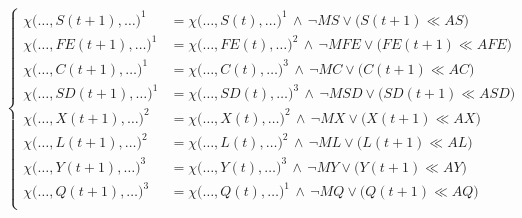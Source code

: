 \begin{equation}
 \begin{cases} 
 \chi\big(\dotsc, S(t + 1),  \dotsc \big)^1 &= \chi\big(\dotsc, S(t),  \dotsc \big)^1 \, \wedge \, \neg MS  \vee \big(S(t + 1)  \ll AS\big) \\
 \chi\big(\dotsc, FE(t + 1), \dotsc \big)^1 &= \chi\big(\dotsc, FE(t), \dotsc \big)^2 \, \wedge \, \neg MFE \vee \big(FE(t + 1) \ll AFE\big) \\ 
 \chi\big(\dotsc, C(t + 1),  \dotsc \big)^1 &= \chi\big(\dotsc, C(t),  \dotsc \big)^3 \, \wedge \, \neg MC  \vee \big(C(t + 1)  \ll AC\big) \\  
 \chi\big(\dotsc, SD(t + 1), \dotsc \big)^1 &= \chi\big(\dotsc, SD(t), \dotsc \big)^3 \, \wedge \, \neg MSD \vee \big(SD(t + 1) \ll ASD\big) \\

 \chi\big(\dotsc, X(t + 1), \dotsc \big)^2 &= \chi\big(\dotsc, X(t), \dotsc \big)^2 \, \wedge \, \neg MX \vee \big(X(t + 1) \ll AX\big) \\     
 \chi\big(\dotsc, L(t + 1), \dotsc \big)^2 &= \chi\big(\dotsc, L(t), \dotsc \big)^2 \, \wedge \, \neg ML \vee \big(L(t + 1) \ll AL\big) \\  
 
 \chi\big(\dotsc, Y(t + 1), \dotsc \big)^3 &= \chi\big(\dotsc, Y(t), \dotsc \big)^3 \, \wedge \, \neg MY \vee \big(Y(t + 1) \ll AY\big) \\   
 \chi\big(\dotsc, Q(t + 1), \dotsc \big)^3 &= \chi\big(\dotsc, Q(t), \dotsc \big)^1 \, \wedge \, \neg MQ \vee \big(Q(t + 1) \ll AQ\big) \\  
 \end{cases}
 \label{eq:operadoresSet}
\end{equation}

